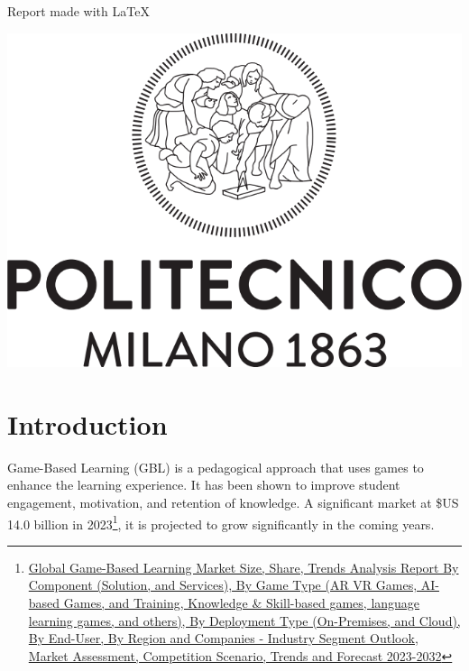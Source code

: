 \documentclass[11pt,italian,a4paper]{article}
\begin{document}
\begin{titlepage}
    \begin{minipage}{0.7\textwidth}
        \begin{minipage}{0.5\textwidth}
            \centering
            {\huge Report made with}\vspace{0.3em} {\Huge \LaTeX}
        \end{minipage}
    \end{minipage}
    \begin{minipage}{0.3\textwidth}
        \flushright
        \includegraphics[width=\textwidth]{figures/Logo_Politecnico_Milano.png}
    \end{minipage}
\end{titlepage}

\tableofcontents

\setlength{\parskip}{0.5em}

\section{Introduction}

Game-Based Learning (GBL) is a pedagogical approach that uses games to enhance the learning experience. It has been shown to improve student engagement, motivation, and retention of knowledge. A significant market at \$US 14.0 billion in 2023\footnote{\href{https://market.us/report/game-based-learning-market/}{Global Game-Based Learning Market Size, Share, Trends Analysis Report By Component (Solution, and Services), By Game Type (AR VR Games, AI-based Games, and Training, Knowledge \& Skill-based games, language learning games, and others), By Deployment Type (On-Premises, and Cloud), By End-User, By Region and Companies - Industry Segment Outlook, Market Assessment, Competition Scenario, Trends and Forecast 2023-2032}}, it is projected to grow significantly in the coming years.
\end{document}
